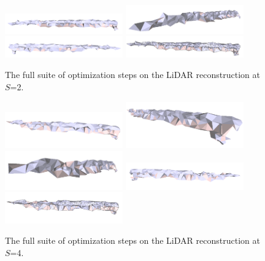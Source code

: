 \documentclass[12pt]{drexelthesis}
\begin{document}
\begin{figure}[!ht]
	\centering
		\includegraphics[width=2in]{real-lab-scans/meshed/optimized/scalespace2everything00.png}
		\includegraphics[width=2in]{real-lab-scans/meshed/optimized/scalespace2everything01.png}
		\includegraphics[width=2in]{real-lab-scans/meshed/optimized/scalespace2everything02.png}
		\includegraphics[width=2in]{real-lab-scans/meshed/optimized/scalespace2everything03.png}
		\caption[The full suite of optimization steps on the LiDAR reconstruction at $S$=2.]{\centering The full suite of optimization steps on the LiDAR reconstruction at $S$=2.}
	\label{lidar:scalespace2everything}
\end{figure}



\begin{figure}[!ht]
	\centering
		\includegraphics[width=2in]{real-lab-scans/meshed/optimized/scalespace4everything00.png}
		\includegraphics[width=2in]{real-lab-scans/meshed/optimized/scalespace4everything01.png}
		\includegraphics[width=2in]{real-lab-scans/meshed/optimized/scalespace4everything02.png}
		\includegraphics[width=2in]{real-lab-scans/meshed/optimized/scalespace4everything03.png}
		\includegraphics[width=2in]{real-lab-scans/meshed/optimized/scalespace4everything04.png}
		\caption[The full suite of optimization steps on the LiDAR reconstruction at $S$=4.]{\centering The full suite of optimization steps on the LiDAR reconstruction at $S$=4.}
	\label{lidar:scalespace4everything}
\end{figure}
\end{document}
